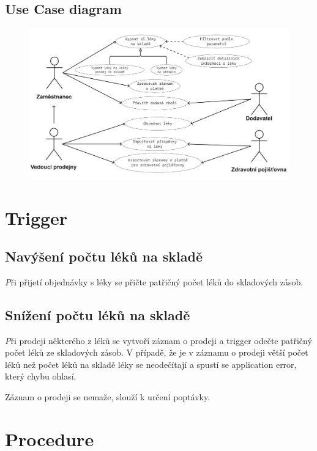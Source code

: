 \documentclass[10pt,a4paper]{article}
\begin{document}
        \subsection{Use Case diagram}
            \begin{figure}[H]
                \centering
                \includegraphics[scale=0.08]{img/useCase.jpg}
                \label{fig:my_label}
            \end{figure}
        
    
        \newpage
    
    \section{Trigger}
        \subsection{Navýšení počtu léků na skladě}
            \textit Při přijetí objednávky s léky se přičte patřičný počet léků do skladových zásob.
        
        \subsection{Snížení počtu léků na skladě}
            \textit Při prodeji některého z léků se vytvoří záznam o prodeji a trigger odečte patřičný počet léků ze skladových zásob. V případě, že je v záznamu o prodeji větší počet léků než počet léků na skladě léky se neodečítají a spustí se application error, který chybu ohlasí.
            
            Záznam o prodeji se nemaže, slouží k určení poptávky.
            
    \section{Procedure}
\end{document}
